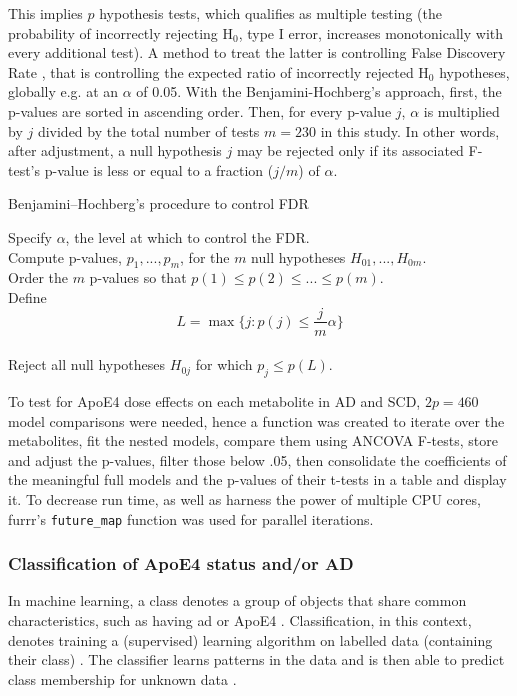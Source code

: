 \documentclass{amsart}
\begin{document}
This implies $p$ hypothesis tests, which qualifies as multiple testing (the probability of incorrectly rejecting H$_0$, type I error, increases monotonically with every additional test). A method to treat the latter is controlling False Discovery Rate \cite{Benjamini1995ControllingTesting}, that is controlling the expected ratio of incorrectly rejected H$_0$ hypotheses, globally e.g. at an $\alpha$ of 0.05. With the Benjamini-Hochberg's approach, first, the p-values are sorted in ascending order. Then, for every p-value $j$, $\alpha$ is multiplied by $j$ divided by the total number of tests \cite{Benjamini1995ControllingTesting} $m = 230$ in this study. In other words, after adjustment, a null hypothesis $j$ may be rejected only if its associated F-test's p-value is less or equal to a fraction ($j/m$) of $\alpha$.

\begin{algorithm}
\caption{Benjamini–Hochberg's procedure to control FDR}\label{alg:fdr}
Specify $\alpha$, the level at which to control the FDR.\\
Compute p-values, $p_1, ... , p_m$, for the $m$ null hypotheses $H_{01},...,H_{0m}$. \\
Order the $m$ p-values so that $p(1) \leq p(2) \leq ... \leq p(m)$.\\
Define
\[L = \max\{j : p(j) \leq \frac{j}{m}\alpha\}\] \\
Reject all null hypotheses $H_{0j}$ for which $p_j \leq p(L)$.
\end{algorithm}

To test for ApoE4 dose effects on each metabolite in AD and SCD, $2p=460$ model comparisons were needed, hence a function was created to iterate over the metabolites, fit the nested models, compare them using ANCOVA F-tests, store and adjust the p-values, filter those below .05, then consolidate the coefficients of the meaningful full models and the p-values of their t-tests in a table and display it. To decrease run time, as well as harness the power of multiple CPU cores, \textsf{furrr}'s \texttt{future\_map} function was used for parallel iterations.

\subsubsection{Classification of ApoE4 status and/or AD}\label{rq2}
In machine learning, a class denotes a group of objects that share common characteristics, such as having \acrshort{ad} or ApoE4 \cite*{Drummond2010}. Classification, in this context, denotes training a (supervised) learning algorithm on labelled data (containing their class) \cite*{Drummond2010}. The classifier learns patterns in the data and is then able to predict class membership for unknown data \cite*{Drummond2010}.
\end{document}
